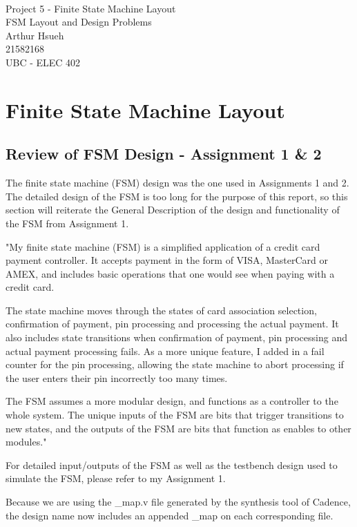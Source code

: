 \documentclass[12pt]{article}
\newcommand{\doctitle}{Project 5 - Finite State Machine Layout}
\newcommand{\docsubtitle}{FSM Layout and Design Problems}
\renewcommand{\maketitle} {
    \setlength{\parindent}{0pt}
    \begin{center} \
        \vspace*{1in}

        \huge{\doctitle}\\
        \Large{\docsubtitle}\\

        \vspace*{0.2in}
        \large{
            Arthur Hsueh\\
            21582168\\
            UBC - ELEC 402
        }
    \end{center}
}
\begin{document}
\maketitle
\thispagestyle{empty}
\pagebreak

\tableofcontents
\thispagestyle{empty}
\pagebreak

\listoffigures
\thispagestyle{empty}

\listoftables
\thispagestyle{empty}

\pagebreak
\setcounter{page}{1}
\section{Finite State Machine Layout}                       %
\subsection{Review of FSM Design - Assignment 1 \& 2}
The finite state machine (FSM) design was the one used in Assignments 1 and 2. The detailed design of the FSM is too long for the purpose of this report, so this section will reiterate the General Description of the design and functionality of the FSM from Assignment 1.

"My finite state machine (FSM) is a simplified application of a credit card payment controller. It accepts payment in the form of VISA, MasterCard or AMEX, and includes basic operations that one would see when paying with a credit card. 

The state machine moves through the states of card association selection, confirmation of payment, pin processing and processing the actual payment. It also includes state transitions when confirmation of payment, pin processing and actual payment processing fails. As a more unique feature, I added in a fail counter for the pin processing, allowing the state machine to abort processing if the user enters their pin incorrectly too many times.

The FSM assumes a more modular design, and functions as a controller to the whole system. The unique inputs of the FSM are bits that trigger transitions to new states, and the outputs of the FSM are bits that function as enables to other modules."

For detailed input/outputs of the FSM as well as the testbench design used to simulate the FSM, please refer to my Assignment 1.

Because we are using the \_map.v file generated by the synthesis tool of Cadence, the design name now includes an appended \_map on each corresponding file.
\end{document}
